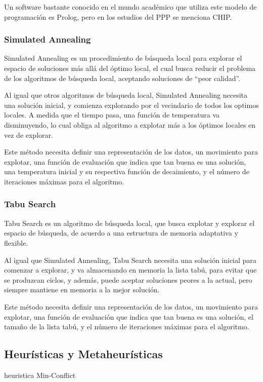 \documentclass[letter, 10pt]{article}
\begin{document}
Un software bastante conocido en el mundo académico que utiliza este modelo de programación es Prolog, pero en los estudios del PPP se menciona CHIP.

\subsubsection{Simulated Annealing}
Simulated Annealing es un procedimiento de búsqueda local para explorar el espacio de soluciones más allá del óptimo local, el cual busca reducir el problema de los algoritmos de búsqueda local, aceptando soluciones de ``peor calidad''.

Al igual que otros algoritmos de búsqueda local, Simulated Annealing necesita una solución inicial, y comienza explorando por el vecindario de todos los optimos locales. A medida que el tiempo pasa, una función de temperatura va disminuyendo, lo cual obliga al algoritmo a explotar más a los óptimos locales en vez de explorar.

Este método necesita definir una representación de los datos, un movimiento para explotar, una función de evaluación que indica que tan buena es una solución, una temperatura inicial y su respectiva función de decaimiento, y el número de iteraciones máximas para el algoritmo.

\subsubsection{Tabu Search}
Tabu Search es un algoritmo de búsqueda local, que busca explotar y explorar el espacio de búsqueda, de acuerdo a una estructura de memoria adaptativa y flexible.

Al igual que Simulated Annealing, Tabu Search necesita una solución inicial para comenzar a explorar, y va almacenando en memoria la lista tabú, para evitar que se produzcan ciclos, y además, puede aceptar soluciones peores a la actual, pero siempre mantiene en memoria a la mejor solución.

Este método necesita definir una representación de los datos, un movimiento para explotar, una función de evaluación que indica que tan buena es una solución, el tamaño de la lista tabú, y el número de iteraciones máximas para el algoritmo.

\subsection{Heurísticas y Metaheurísticas}
\cite{LocalSearch} heuristica Min-Conflict
\end{document}
